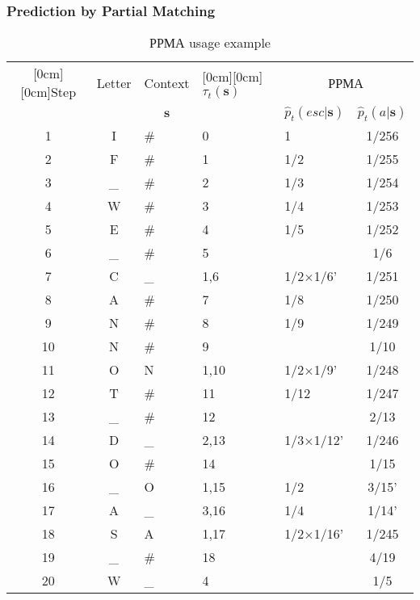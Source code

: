 \documentclass[14pt]{beamer}
\renewcommand{\vec}[1]{\ensuremath{\boldsymbol{#1}}}
\begin{document}
\begin{frame}
\frametitle{Prediction by Partial Matching}
\begin{itemize}    

    \begin{table}[htbp]
    \caption{РРМА usage example}
    \scriptsize{
    \begin{center}
    \scalebox{0.7} {
    \begin{tabular}
    {|c|c|l|l|l|c|} \hline %
    \raisebox{-1.50ex}[0cm][0cm]{Step}&
    {Letter}&
    {Context }&
    \raisebox{-1.50ex}[0cm][0cm]{$\tau _t ({\vec s})$}&
    \multicolumn{2}{c|}{РРМА}  \\
    \cline{5-6}
     & &\multicolumn{1}{c|}{$\vec s$}& &
    $\hat {p}_t(esc\vert {\vec s})$& $\hat {p}_t(a\vert {\vec s})$ \\ \hline%
    1& I& {{\#}}& 0& 1& 1/256 \\\hline %
    2& F& {\#}& 1& 1/2& 1/255 \\\hline %
    3& {\_}& {\#}& 2& 1/3& 1/254 \\ \hline %
    4& W& {\#}& 3& 1/4& 1/253 \\ \hline %
    5& E& {\#}& 4& 1/5& 1/252 \\ \hline %
    6& {\_}& {\#}& 5& & 1/6 \\ \hline %
    7& C& {\_}& 1,6& 1/2$\times $1/6'& 1/251 \\ \hline %
    8& A& {\#}& 7& 1/8& 1/250 \\ \hline %
    9& N& {\#}& 8& 1/9& 1/249 \\ \hline %
    10& N& {\#}& 9& & 1/10 \\ \hline %
    11& O& N & 1,10& 1/2$\times $1/9'& 1/248 \\ \hline %
    12& T& {\#}& 11& 1/12& 1/247 \\ \hline %
    13& {\_}& {\#}& 12& & 2/13 \\ \hline %
    14& D& {\_}& 2,13& 1/3$\times $1/12'& 1/246 \\ \hline %
    15& O& {\#}& 14& & 1/15 \\ \hline %
    16& {\_}& O & 1,15& 1/2& 3/15' \\ \hline %
    17& A& {\_}& 3,16& 1/4& 1/14' \\ \hline %
    18& S& A & 1,17& 1/2$\times $1/16'& 1/245 \\\hline %
    19& {\_}& {\#}& 18& & 4/19 \\ \hline %
    20& W& {\_}& 4& & 1/5 \\ \hline %

\end{tabular}}
\end{center}}
\end{table}
\end{itemize}
\end{frame}
\end{document}
